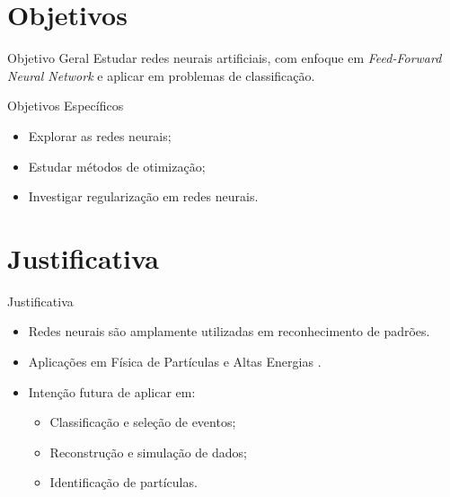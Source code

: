 \documentclass[11pt]{beamer}
\begin{document}
	\section{Objetivos}
	\begin{frame}{Objetivo Geral}
		Estudar redes neurais artificiais, com enfoque em \textit{Feed-Forward Neural Network} e aplicar em problemas de classificação.
	\end{frame}
	
	\begin{frame}{Objetivos Específicos}
		\begin{itemize}
			\item Explorar as redes neurais;
			\item Estudar métodos de otimização;
			\item Investigar regularização em redes neurais.
		\end{itemize}
	\end{frame}
	
	\section{Justificativa}
	\begin{frame}{Justificativa}
		\begin{itemize}
			\item Redes neurais são amplamente utilizadas em reconhecimento de padrões.
			\item Aplicações em Física de Partículas e Altas Energias \cite{Bourilkov_2019}.
			\item Intenção futura de aplicar em:
			\begin{itemize}
				\item Classificação e seleção de eventos;
				\item Reconstrução e simulação de dados;
				\item Identificação de partículas.
			\end{itemize}
		\end{itemize}
	\end{frame}
	
\end{document}
